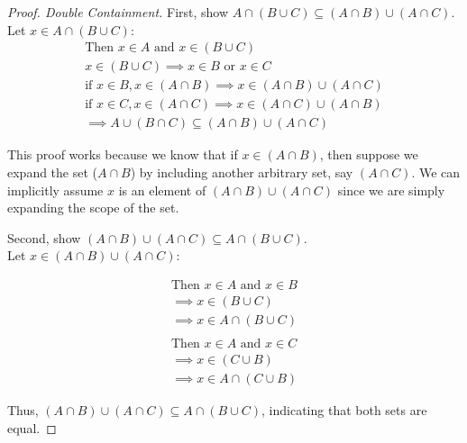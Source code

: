 \documentclass[12pt]{article}
\theoremstyle{definition}
\begin{document}
            \begin{proof}[Proof. Double Containment]
                First, show $A \cap (B \cup C) \subseteq (A \cap B) \cup (A \cap C)$. \\
                Let $x \in A \cap (B \cup C)$:
                \begin{align*}
                    \text{Then $x \in A$ and $x \in (B \cup C)$} \\
                    x \in (B \cup C) \implies x \in B \text{ or } x \in C \\
                    \text{if $x \in B$}, x \in (A \cap B) \implies x \in (A \cap B) \cup (A \cap C) \\
                    \text{if $x \in C$}, x \in (A \cap C) \implies x \in (A \cap C) \cup (A \cap B) \\
                    \implies A \cup  (B \cap C) \subseteq (A \cap B) \cup (A \cap C)
                \end{align*}

                This proof works because we know that if $x \in (A \cap B)$, then suppose we expand the set ($A \cap B$) by
                including another arbitrary set, say $(A \cap C)$. We can implicitly assume $x$ is an element of $(A \cap B) \cup (A \cap C)$
                since we are simply expanding the scope of the set.

                Second, show $(A \cap B) \cup (A \cap C) \subseteq A \cap (B \cup C)$. \\
                Let $x \in (A \cap B) \cup (A \cap C)$:

                \begin{align*}
                    \text{Then $x \in A$ and $x \in B$} \\
                    \implies x \in (B \cup C) \\
                    \implies x \in A \cap (B \cup C) \\
                \end{align*}
                \begin{align*}
                    \text{Then $x \in A$ and $x \in C$} \\
                    \implies x \in (C \cup B) \\
                    \implies x \in A \cap (C \cup B)
                \end{align*}
                
                Thus, $(A \cap B) \cup (A \cap C) \subseteq A \cap (B \cup C)$, indicating that both sets are equal.

            \end{proof}
\end{document}
